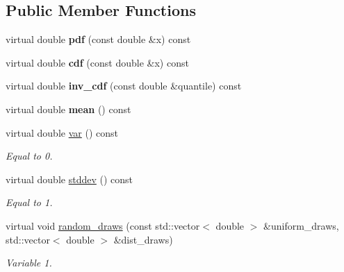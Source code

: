 \subsection*{Public Member Functions}
\begin{DoxyCompactItemize}
\item 
\mbox{\label{classStandardNormalDistribution_aa13a3e08de0d6c210f12f6b662a96797}} 
virtual double {\bfseries pdf} (const double \&x) const
\item 
\mbox{\label{classStandardNormalDistribution_a3fa7f2413b10c05cbc9e08a96d4119cc}} 
virtual double {\bfseries cdf} (const double \&x) const
\item 
\mbox{\label{classStandardNormalDistribution_a51a7b166106a8d3a8cb49a6e39fede7e}} 
virtual double {\bfseries inv\+\_\+cdf} (const double \&quantile) const
\item 
\mbox{\label{classStandardNormalDistribution_ac3a7c8dd5787428010756b1431904b53}} 
virtual double {\bfseries mean} () const
\item 
\mbox{\label{classStandardNormalDistribution_a145bb7fff13e1daebaccd878c783ef1c}} 
virtual double \hyperlink{classStandardNormalDistribution_a145bb7fff13e1daebaccd878c783ef1c}{var} () const
\begin{DoxyCompactList}\small\item\em Equal to 0. \end{DoxyCompactList}\item 
\mbox{\label{classStandardNormalDistribution_a453eee16a74d17e10fbdbf7c224d87d6}} 
virtual double \hyperlink{classStandardNormalDistribution_a453eee16a74d17e10fbdbf7c224d87d6}{stddev} () const
\begin{DoxyCompactList}\small\item\em Equal to 1. \end{DoxyCompactList}\item 
\mbox{\label{classStandardNormalDistribution_a5289fe3625483f32e0c82bafa467f20d}} 
virtual void \hyperlink{classStandardNormalDistribution_a5289fe3625483f32e0c82bafa467f20d}{random\+\_\+draws} (const std\+::vector$<$ double $>$ \&uniform\+\_\+draws, std\+::vector$<$ double $>$ \&dist\+\_\+draws)
\begin{DoxyCompactList}\small\item\em Variable 1. \end{DoxyCompactList}\end{DoxyCompactItemize}


